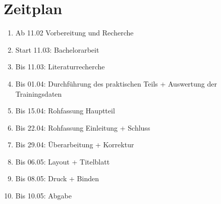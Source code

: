 \documentclass[a4paper,12pt,oneside]{article}
\begin{document}
  
  \section{Zeitplan}  
  
  \begin{enumerate}
  \item Ab 11.02     	Vorbereitung und Recherche
  \item Start 11.03: 	Bachelorarbeit
  \item Bis 11.03: 		Literaturrecherche
  \item Bis 01.04: 		Durchführung des praktischen Teils + Auswertung der Trainingsdaten
  \item Bis 15.04:		Rohfassung Hauptteil
  \item Bis 22.04:		Rohfassung Einleitung + Schluss
  \item Bis 29.04:		Überarbeitung + Korrektur
  \item Bis 06.05:		Layout + Titelblatt
  \item Bis 08.05:		Druck + Binden
  \item Bis 10.05:		Abgabe
  \end{enumerate}
  
\end{document}
